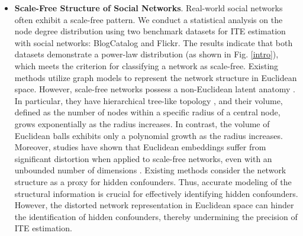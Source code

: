 \documentclass[twoside,leqno,twocolumn]{article}
\begin{document}
\begin{itemize}[leftmargin=*,topsep=0pt,parsep=0pt]
\setlength{\topsep}{0pt}
\setlength{\itemsep}{0pt}
\setlength{\parsep}{0pt}
\setlength{\parskip}{0pt}
\item \textbf{Scale-Free Structure of Social Networks}. 
Real-world social networks often exhibit a scale-free pattern. 
We conduct a statistical analysis on the node degree distribution using two benchmark datasets for ITE estimation with social networks: BlogCatalog and Flickr. 
The results indicate that both datasets demonstrate a power-law distribution (as shown in Fig. \ref{intro}), which meets the criterion for classifying a network as scale-free.
Existing methods utilize graph models to represent the network structure in Euclidean space. However, scale-free networks possess a non-Euclidean latent anatomy \cite{yang2022hyperbolic}. In particular, they have hierarchical tree-like topology \cite{chami2019hyperbolic}, and their volume, defined as the number of nodes within a specific radius of a central node, grows exponentially as the radius increases. In contrast, the volume of Euclidean balls exhibits only a polynomial growth as the radius increases. Moreover, studies have shown that Euclidean embeddings suffer from significant distortion when applied to scale-free networks\cite{chen2013hyperbolicity,chami2019hyperbolic,du2022hakg,sala2018representation}, even with an unbounded number of dimensions \cite{sala2018representation}. 
Existing methods consider the network structure as a proxy for hidden confounders. Thus, accurate modeling of the structural information is crucial for effectively identifying hidden confounders. However, the distorted network representation in Euclidean space can hinder the identification of hidden confounders, thereby undermining the precision of ITE estimation.


\end{itemize}
\end{document}
